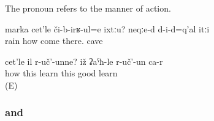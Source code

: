 
\subsubsection{ }
\label{sssec:cetle how}

The pronoun  refers to the manner of action.
%
\begin{exe}
	\ex	\label{ex:How can rain fall there? They are inside a cave}
	\gll	marka	cet'le	či-b-irʁ-ul=e	ixtːu?	neqːe-d	d-i-d=q'al	itːi\\
		rain	how	come	there.	cave		\\
	\glt	{}

	\ex	\label{ex:How is she studying? She is studying well}
	\gll	cet'le il	r-uč'-unne?	iž ʡaˁħ-le r-uč'-un ca-r\\
		how	this	learn	this	good	learn \\
	\glt	{} (E)
\end{exe}



\subsubsection{ and  }
\label{sssec:kuti and ceruna which}

